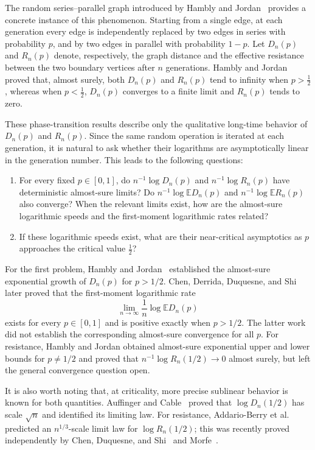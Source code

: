 \documentclass[a4paper,fleqn]{cas-sc}
\numberwithin{equation}{section}
\theoremstyle{plain}
\theoremstyle{definition}
\newcommand{\E}{\mathbb E}
\begin{document}
The random series--parallel graph introduced by Hambly and
Jordan~\cite{HamblyJordan2004} provides a concrete instance of this
phenomenon.  Starting from a single edge, at each generation every edge is
independently replaced by two edges in series with probability $p$, and by
two edges in parallel with probability $1-p$.  Let $D_n(p)$ and $R_n(p)$
denote, respectively, the graph distance and the effective resistance
between the two boundary vertices after $n$ generations.  Hambly and
Jordan~\cite[Theorem~2.1 and Lemma~3.1]{HamblyJordan2004}
proved that, almost surely, both $D_n(p)$ and $R_n(p)$ tend to infinity when
$p>\frac12$, whereas when $p<\frac12$, $D_n(p)$ converges to a finite limit
and $R_n(p)$ tends to zero.

These phase-transition results describe only the qualitative long-time
behavior of $D_n(p)$ and $R_n(p)$.  Since the same random operation is
iterated at each generation, it is natural to ask whether their logarithms
are asymptotically linear in the generation number.  This leads to the
following questions:
\begin{enumerate}
\item For every fixed $p\in[0,1]$, do $n^{-1}\log D_n(p)$ and
$n^{-1}\log R_n(p)$ have deterministic almost-sure limits?  Do
$n^{-1}\log\E D_n(p)$ and $n^{-1}\log\E R_n(p)$ also converge?  When the
relevant limits exist, how are the almost-sure logarithmic speeds and the
first-moment logarithmic rates related?
\item If these logarithmic speeds exist, what are their near-critical
asymptotics as $p$ approaches the critical value $\frac12$?
\end{enumerate}

For the first problem, Hambly and Jordan~\cite[Lemma 3.1(a)]{HamblyJordan2004} established
the almost-sure exponential growth of $D_n(p)$ for $p>1/2$.  Chen, Derrida,
Duquesne, and
Shi~\cite[equation~(1.2)]{ChenDerridaDuquesneShi2026} later proved that the
first-moment logarithmic rate
\[
 \lim_{n\to\infty}\frac1n\log\E D_n(p)
\]
exists for every $p\in[0,1]$ and is positive exactly when $p>1/2$.  The latter
work did not establish the corresponding almost-sure convergence for all
$p$.  For resistance, Hambly and Jordan obtained almost-sure exponential
upper and lower bounds for $p\ne1/2$ and proved that
$n^{-1}\log R_n(1/2)\to0$ almost surely,
but left the general convergence question open.

It is also worth noting that, at criticality, more precise sublinear behavior
is known for both quantities.  Auffinger and
Cable~\cite[Theorem~1]{AuffingerCable2017} proved that
$\log D_n(1/2)$ has scale $\sqrt n$ and identified its limiting law.  For
resistance, Addario-Berry et al.~\cite{AddarioBerryEtAl2020} predicted an
$n^{1/3}$-scale limit law for $\log R_n(1/2)$; this was recently proved
independently by Chen, Duquesne, and Shi~\cite{ChenDuquesneShi2026} and
Morfe~\cite{Morfe2026}.
\end{document}
